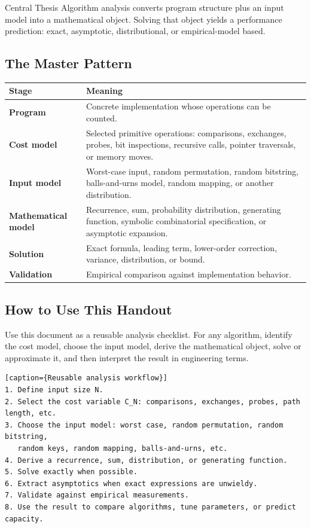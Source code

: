 \documentclass[11pt]{article}
\begin{document}
\begin{keybox}{Central Thesis}
Algorithm analysis converts program structure plus an input model into a mathematical object. Solving that object yields a performance prediction: exact, asymptotic, distributional, or empirical-model based.
\end{keybox}

\subsection{The Master Pattern}

\begin{center}
\begin{tabularx}{\textwidth}{>{\bfseries\color{HouseBlue}}L{0.20\textwidth} Y}
\toprule
Stage & Meaning \\
\midrule
Program & Concrete implementation whose operations can be counted. \\
Cost model & Selected primitive operations: comparisons, exchanges, probes, bit inspections, recursive calls, pointer traversals, or memory moves. \\
Input model & Worst-case input, random permutation, random bitstring, balls-and-urns model, random mapping, or another distribution. \\
Mathematical model & Recurrence, sum, probability distribution, generating function, symbolic combinatorial specification, or asymptotic expansion. \\
Solution & Exact formula, leading term, lower-order correction, variance, distribution, or bound. \\
Validation & Empirical comparison against implementation behavior. \\
\bottomrule
\end{tabularx}
\end{center}

\subsection{How to Use This Handout}

Use this document as a reusable analysis checklist. For any algorithm, identify the cost model, choose the input model, derive the mathematical object, solve or approximate it, and then interpret the result in engineering terms.

\begin{verbatim}[caption={Reusable analysis workflow}]
1. Define input size N.
2. Select the cost variable C_N: comparisons, exchanges, probes, path length, etc.
3. Choose the input model: worst case, random permutation, random bitstring,
   random keys, random mapping, balls-and-urns, etc.
4. Derive a recurrence, sum, distribution, or generating function.
5. Solve exactly when possible.
6. Extract asymptotics when exact expressions are unwieldy.
7. Validate against empirical measurements.
8. Use the result to compare algorithms, tune parameters, or predict capacity.
\end{verbatim}
\end{document}
